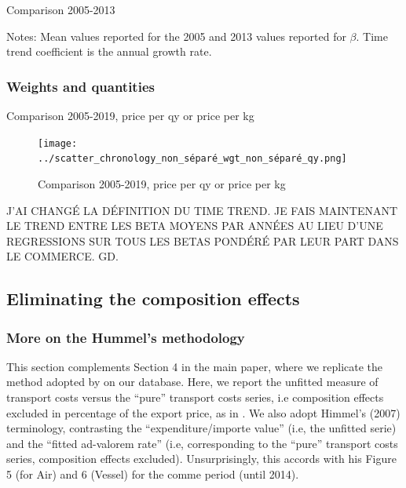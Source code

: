\documentclass[11pt,twoside, authoryear]{elsarticle}
\begin{document}
\begin{table}[htbp]
	\caption{Comparison 2005-2013}
	\begin{center}		
		
	
{\parbox[l]{12cm}{ \vspace{4pt}\footnotesize{Notes: Mean values reported for the 2005 and 2013 values reported for $\beta$. Time trend coefficient is the annual growth rate.}}}
\end{center}
	\label{tab_comp_referee1_baseline}%
\end{table}%




\subsubsection{Weights and quantities}


\begin{table}[htbp]
	\caption{Comparison 2005-2019, price per qy or price per kg}
	\begin{center}		
		
	\end{center}
	\label{tab_comp_referee1_baseline}%
\end{table}%




\begin{figure}[htbp]
	\caption{Comparison 2005-2019, price per qy or price per kg}
	\begin{center}
	\texttt{[image: ../scatter\_chronology\_non\_séparé\_wgt\_non\_séparé\_qy.png]}
	\end{center}
\end{figure}

J’AI CHANGÉ LA DÉFINITION DU TIME TREND. JE FAIS MAINTENANT LE TREND ENTRE LES BETA MOYENS PAR ANNÉES AU LIEU D’UNE REGRESSIONS SUR TOUS LES BETAS PONDÉRÉ PAR LEUR PART DANS LE COMMERCE. GD.

\subsection{Eliminating the composition effects} \label{sec_oa:comp-effects}

\subsubsection{More on the Hummel's methodology}

This section complements Section 4 in the main paper, where we replicate the method adopted by \cite{hummels2007} on our database. Here, we report the unfitted measure of transport costs versus the ``pure'' transport costs series, i.e composition effects excluded
in percentage of the export price, as in \cite{hummels2007}. We also adopt Himmel's (2007) terminology, contrasting the ``expenditure/importe value'' (i.e, the unfitted serie) and the ``fitted ad-valorem rate'' (i.e, corresponding to the ``pure'' transport costs series, composition effects excluded). Unsurprisingly, this accords with his Figure 5 (for Air) and 6 (Vessel) for the comme period (until 2014).
\end{document}
